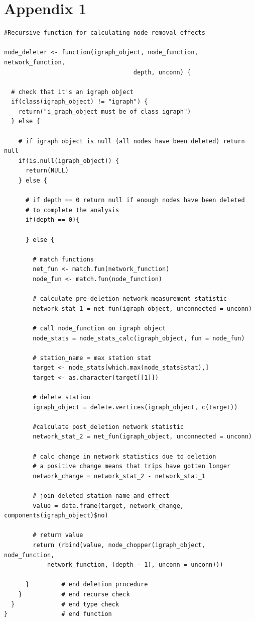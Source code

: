 \documentclass[11pt]{article} %
\begin{document}
\pagebreak

\section{Appendix 1}

\begin{verbatim}
#Recursive function for calculating node removal effects
  
node_deleter <- function(igraph_object, node_function, network_function, 
									depth, unconn) {

  # check that it's an igraph object
  if(class(igraph_object) != "igraph") {
    return("i_graph_object must be of class igraph")
  } else {
    
    # if igraph object is null (all nodes have been deleted) return null
    if(is.null(igraph_object)) {
      return(NULL)
    } else {
      
      # if depth == 0 return null if enough nodes have been deleted 
      # to complete the analysis
      if(depth == 0){
        
      } else {
        
        # match functions
        net_fun <- match.fun(network_function)
        node_fun <- match.fun(node_function)
        
        # calculate pre-deletion network measurement statistic 
        network_stat_1 = net_fun(igraph_object, unconnected = unconn)
        
        # call node_function on igraph object
        node_stats = node_stats_calc(igraph_object, fun = node_fun)
        
        # station_name = max station stat
        target <- node_stats[which.max(node_stats$stat),]
        target <- as.character(target[[1]])
        
        # delete station
        igraph_object = delete.vertices(igraph_object, c(target))
        
        #calculate post_deletion network statistic
        network_stat_2 = net_fun(igraph_object, unconnected = unconn)
        
        # calc change in network statistics due to deletion
        # a positive change means that trips have gotten longer
        network_change = network_stat_2 - network_stat_1
        
        # join deleted station name and effect
        value = data.frame(target, network_change, components(igraph_object)$no)
        
        # return value
        return (rbind(value, node_chopper(igraph_object, node_function, 
        	network_function, (depth - 1), unconn = unconn)))
        
      } 		# end deletion procedure
    } 			# end recurse check 
  } 			# end type check 
} 				# end function


\end{verbatim}

\nocite{*}


\printbibliography
\end{document}
